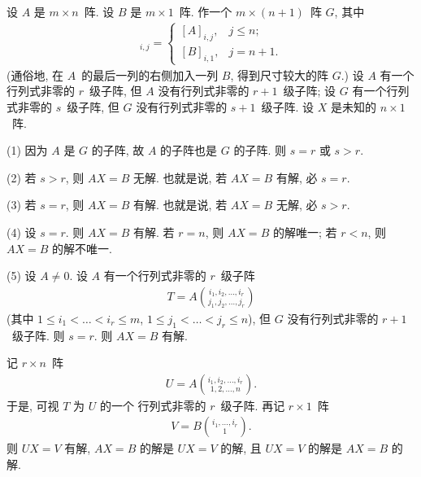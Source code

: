 \begin{theorem}
    设 \(A\) 是 \(m \times n\)~阵.
    设 \(B\) 是 \(m \times 1\)~阵.
    作一个 \(m \times (n+1)\)~阵 \(G\),
    其中
    \begin{align*}
        [G]_{i,j}
        = \begin{cases}
              [A]_{i,j}, & j \leq n;  \\
              [B]_{i,1}, & j = n + 1.
          \end{cases}
    \end{align*}
    (通俗地, 在 \(A\)~的最后一列的右侧加入一列 \(B\),
    得到尺寸较大的阵 \(G\).)
    设 \(A\) 有一个行列式非零的 \(r\)~级子阵,
    但 \(A\) 没有行列式非零的 \(r+1\)~级子阵;
    设 \(G\) 有一个行列式非零的 \(s\)~级子阵,
    但 \(G\) 没有行列式非零的 \(s+1\)~级子阵.
    设 \(X\) 是未知的 \(n \times 1\)~阵.

    (1)
    因为 \(A\) 是 \(G\) 的子阵,
    故 \(A\) 的子阵也是 \(G\) 的子阵.
    则 \(s = r\) 或 \(s > r\).

    (2)
    若 \(s > r\), 则 \(AX = B\) 无解.
    也就是说, 若 \(AX = B\) 有解, 必 \(s = r\).

    (3)
    若 \(s = r\), 则 \(AX = B\) 有解.
    也就是说, 若 \(AX = B\) 无解, 必 \(s > r\).

    (4)
    设 \(s = r\).
    则 \(AX = B\) 有解.
    若 \(r = n\), 则 \(AX = B\) 的解唯一;
    若 \(r < n\), 则 \(AX = B\) 的解不唯一.

    (5)
    设 \(A \neq 0\).
    设 \(A\) 有一个行列式非零的 \(r\)~级子阵
    \begin{align*}
        T = A\binom{i_1,i_2,\dots,i_r}{j_1,j_2,\dots,j_r}
    \end{align*}
    (其中 \(1 \leq i_1 < \dots < i_r \leq m\),
    \(1 \leq j_1 < \dots < j_r \leq n\)),
    但 \(G\) 没有行列式非零的 \(r+1\)~级子阵.
    则 \(s = r\).
    则 \(AX = B\) 有解.

    记 \(r \times n\)~阵
    \begin{align*}
        U = A\binom{i_1,i_2,\dots,i_r}{1,2,\dots,n}.
    \end{align*}
    于是, 可视 \(T\) 为 \(U\) 的一个%
    行列式非零的 \(r\)~级子阵.
    再记 \(r \times 1\)~阵
    \begin{align*}
        V = B\binom{i_1,\dots,i_r}{1}
        .
    \end{align*}
    则 \(UX = V\) 有解,
    \(AX = B\) 的解是 \(UX = V\) 的解,
    且 \(UX = V\) 的解是 \(AX = B\) 的解.


\end{theorem}

